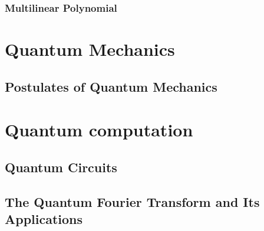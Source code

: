 \documentclass[
	11pt, %
	a4paper, %
]{LegrandOrangeBook}
\begin{document}
    \section{Multilinear Polynomial}
    


\part{Quantum Mechanics}

\chapter{Postulates of Quantum Mechanics}


\part{Quantum computation}

\chapter{Quantum Circuits}

\chapter{The Quantum Fourier Transform and Its Applications}
\end{document}
